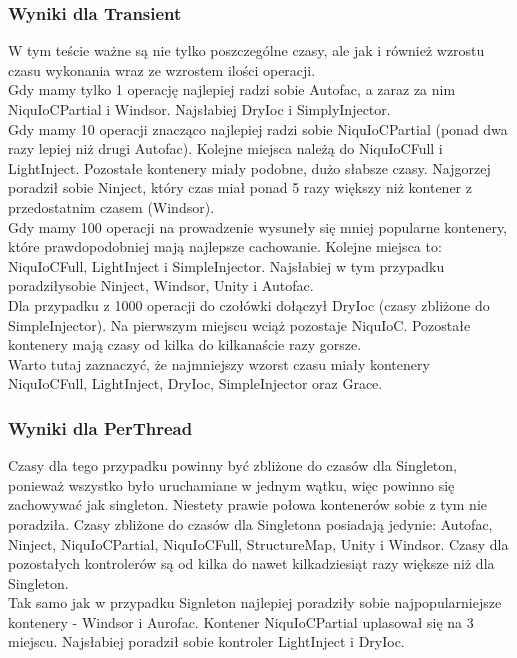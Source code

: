 \documentclass[12pt]{article}
\begin{document}
\subsubsection{Wyniki dla Transient}
W tym teście ważne są nie tylko poszczególne czasy, ale jak i również wzrostu czasu wykonania wraz ze wzrostem ilości operacji.\\
Gdy mamy tylko 1 operację najlepiej radzi sobie Autofac, a zaraz za nim NiquIoCPartial i Windsor. Najsłabiej DryIoc i SimplyInjector.\\
Gdy mamy 10 operacji znacząco najlepiej radzi sobie NiquIoCPartial (ponad dwa razy lepiej niż drugi Autofac). Kolejne miejsca należą do NiquIoCFull i LightInject. Pozostałe kontenery miały podobne, dużo słabsze czasy. Najgorzej poradził sobie Ninject, który czas miał ponad 5 razy większy niż kontener z przedostatnim czasem (Windsor).\\
Gdy mamy 100 operacji na prowadzenie wysuneły się mniej popularne kontenery, które prawdopodobniej mają najlepsze cachowanie. Kolejne miejsca to: NiquIoCFull, LightInject i SimpleInjector. Najsłabiej w tym przypadku poradziłysobie Ninject, Windsor, Unity i Autofac.\\
Dla przypadku z 1000 operacji do czołówki dołączył DryIoc (czasy zbliżone do SimpleInjector). Na pierwszym miejscu wciąż pozostaje NiquIoC. Pozostałe kontenery mają czasy od kilka do kilkanaście razy gorsze.\\
Warto tutaj zaznaczyć, że najmniejszy wzorst czasu miały kontenery NiquIoCFull, LightInject, DryIoc, SimpleInjector oraz Grace.

\subsubsection{Wyniki dla PerThread}
Czasy dla tego przypadku powinny być zbliżone do czasów dla Singleton, ponieważ wszystko było uruchamiane w jednym wątku, więc powinno się zachowywać jak singleton. Niestety prawie połowa kontenerów sobie z tym nie poradziła. Czasy zbliżone do czasów dla Singletona posiadają jedynie: Autofac, Ninject, NiquIoCPartial, NiquIoCFull, StructureMap, Unity i Windsor. Czasy dla pozostałych kontrolerów są od kilka do nawet kilkadziesiąt razy większe niż dla Singleton.\\
Tak samo jak w przypadku Signleton najlepiej poradziły sobie najpopularniejsze kontenery - Windsor i Aurofac. Kontener NiquIoCPartial uplasował się na 3 miejscu. Najsłabiej poradził sobie kontroler LightInject i DryIoc.
\end{document}
